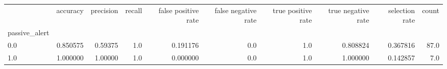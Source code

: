\begin{tabular}{lrrrrrrrrr}
\toprule
{} &  accuracy &  precision &  recall &  false positive rate &  false negative rate &  true positive rate &  true negative rate &  selection rate &  count \\
passive\_alert &           &            &         &                      &                      &                     &                     &                 &        \\
\midrule
0.0           &  0.850575 &    0.59375 &     1.0 &             0.191176 &                  0.0 &                 1.0 &            0.808824 &        0.367816 &   87.0 \\
1.0           &  1.000000 &    1.00000 &     1.0 &             0.000000 &                  0.0 &                 1.0 &            1.000000 &        0.142857 &    7.0 \\
\bottomrule
\end{tabular}
